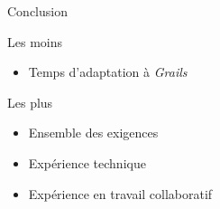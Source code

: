 \AntoineSpeak
\begin{frame}{Conclusion}
	\pause
	\begin{alertblock}{Les moins}
		\begin{itemize}
			\item Temps d'adaptation à \textit{Grails}
		\end{itemize}
	\end{alertblock}
	\pause
	\vfill
	\begin{exampleblock}{Les plus}
		\begin{itemize}
			\item Ensemble des exigences  \cmark
			\item Expérience technique
			\item Expérience en travail collaboratif
		\end{itemize}
	\end{exampleblock}	
\end{frame}

